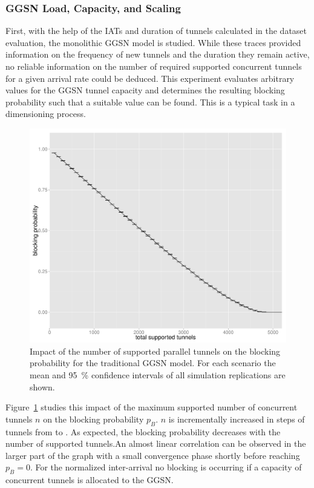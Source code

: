 \subsubsection{GGSN Load, Capacity, and Scaling}

First, with the help of the \glspl{IAT} and duration of tunnels calculated in the dataset evaluation, the monolithic \gls{GGSN} model is studied. While these traces provided information on the frequency of new tunnels and the duration they remain active, no reliable information on the number of required supported concurrent tunnels for a given arrival rate could be deduced. 
This experiment evaluates arbitrary values for the \gls{GGSN} tunnel capacity and determines the resulting blocking probability such that a suitable value can be found. This is a typical task in a dimensioning process.

\begin{figure}[htb]
  \centering
  \includegraphics[width=1.0\textwidth]{images/R-monolithic-blocking.pdf}
  \caption{Impact of the number of supported parallel tunnels on the blocking probability for the traditional \gls{GGSN} model. For each scenario the mean and \SI{95}{\percent} confidence intervals of all simulation replications are shown.}
\label{c4:fig:traditional_blocking}
\end{figure}

Figure~\ref{c4:fig:traditional_blocking} studies this impact of the maximum supported number of concurrent tunnels $n$ on the blocking probability $p_B$. $n$ is incrementally increased in steps of  tunnels from  to . As expected, the blocking probability decreases with the number of supported tunnels.An almost linear correlation can be observed in the larger part of the graph with a small convergence phase shortly before reaching $p_B=0$. For the normalized inter-arrival no blocking is occurring if a capacity of  concurrent tunnels is allocated to the \gls{GGSN}.

